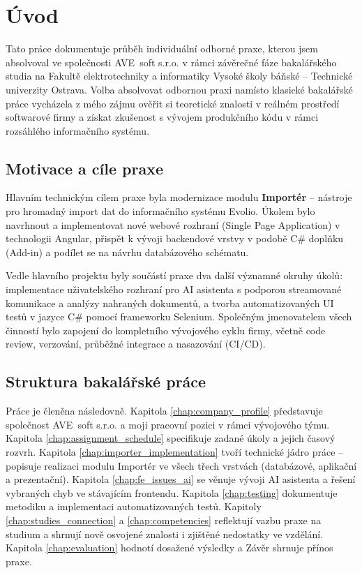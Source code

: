 \chapter*{Úvod}
\label{chap:introduction}

Tato práce dokumentuje průběh individuální odborné praxe, kterou jsem absolvoval ve společnosti AVE~soft s.r.o. v rámci závěrečné fáze bakalářského studia na Fakultě elektrotechniky a informatiky Vysoké školy báňské -- Technické univerzity Ostrava. Volba absolvovat odbornou praxi namísto klasické bakalářské práce vycházela z mého zájmu ověřit si teoretické znalosti v reálném prostředí softwarové firmy a získat zkušenost s vývojem produkčního kódu v rámci rozsáhlého informačního systému.

\section*{Motivace a cíle praxe}

Hlavním technickým cílem praxe byla modernizace modulu \textbf{Importér} -- nástroje pro hromadný import dat do informačního systému Evolio. Úkolem bylo navrhnout a implementovat nové webové rozhraní (Single Page Application) v technologii Angular, přispět k vývoji backendové vrstvy v podobě C\# doplňku (Add-in) a podílet se na návrhu databázového schématu.

Vedle hlavního projektu byly součástí praxe dva další významné okruhy úkolů: implementace uživatelského rozhraní pro AI asistenta s podporou streamované komunikace a analýzy nahraných dokumentů, a tvorba automatizovaných UI testů v jazyce C\# pomocí frameworku Selenium. Společným jmenovatelem všech činností bylo zapojení do kompletního vývojového cyklu firmy, včetně code review, verzování, průběžné integrace a nasazování (CI/CD).

\section*{Struktura bakalářské práce}

Práce je členěna následovně. Kapitola \ref{chap:company_profile} představuje společnost AVE~soft s.r.o. a moji pracovní pozici v rámci vývojového týmu. Kapitola \ref{chap:assignment_schedule} specifikuje zadané úkoly a jejich časový rozvrh. Kapitola \ref{chap:importer_implementation} tvoří technické jádro práce -- popisuje realizaci modulu Importér ve všech třech vrstvách (databázové, aplikační a prezentační). Kapitola \ref{chap:fe_issues_ai} se věnuje vývoji AI asistenta a řešení vybraných chyb ve stávajícím frontendu. Kapitola \ref{chap:testing} dokumentuje metodiku a implementaci automatizovaných testů. Kapitoly \ref{chap:studies_connection} a \ref{chap:competencies} reflektují vazbu praxe na studium a shrnují nově osvojené znalosti i zjištěné nedostatky ve vzdělání. Kapitola \ref{chap:evaluation} hodnotí dosažené výsledky a Závěr shrnuje přínos praxe.

